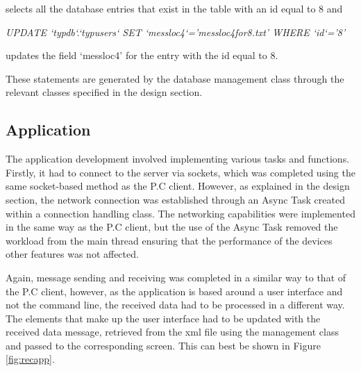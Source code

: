 \documentclass[a4paper,12pt]{report}
\begin{document}
selects all the database entries that exist in the table with an id equal to 8 and


\begin{center}
  \textit{UPDATE `typdb`.`typusers` SET `messloc4`='messloc4for8.txt' WHERE `id`='8'}
\end{center}

updates the field ‘messloc4’ for the entry with the id equal to 8.

These statements are generated by the database management class through the relevant classes specified in the design section.

\subsection{Application}

The application development involved implementing various tasks and functions. Firstly, it had to connect to the server via sockets, which was completed using the same socket-based method as the P.C client. However, as explained in the design section, the network connection was established through an Async Task created within a connection handling class. The networking capabilities were implemented in the same way as the P.C client, but the use of the Async Task removed the workload from the main thread ensuring that the performance of the devices other features was not affected.

Again, message sending and receiving was completed in a similar way to that of the P.C client, however, as the application is based around a user interface and not the command line, the received data had to be processed in a different way. The elements that make up the user interface had to be updated with the received data message, retrieved from the xml file using the management class and passed to the corresponding screen. This can best be shown in Figure \ref{fig:recapp}.
\end{document}
